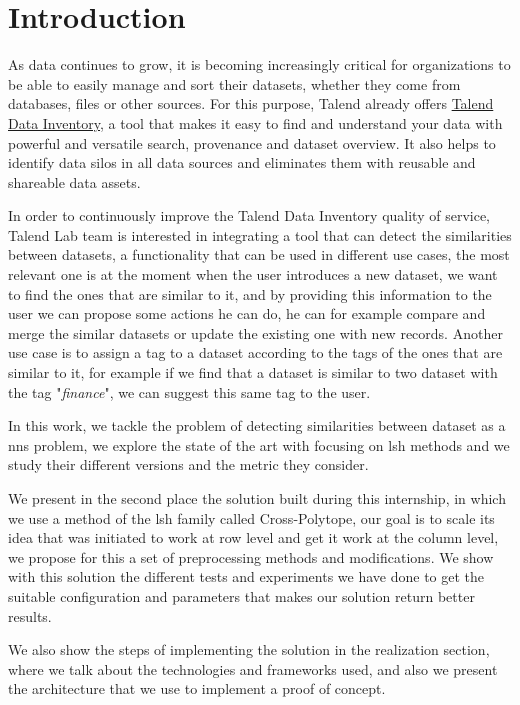 \chapter*{Introduction}

As data continues to grow, it is becoming increasingly critical for
organizations to be able to easily manage and sort their datasets, whether they
come from databases, files or other sources. For this purpose, Talend already
offers \href{https://www.talend.com/products/data-inventory/}{Talend Data
Inventory}, a tool that makes it easy to find and understand your data with
powerful and versatile search, provenance and dataset overview. It also helps to
identify data silos in all data sources and eliminates them with reusable and
shareable data assets.

In order to continuously improve the Talend Data Inventory quality of service,
Talend Lab team is interested in integrating a tool that can detect the
similarities between datasets, a functionality that can be used in different use
cases, the most relevant one is at the moment when the user introduces a new
dataset, we want to find the ones that are similar to it, and by providing this
information to the user we can propose some actions he can do, he can for
example compare and merge the similar datasets or update the existing one with
new records. Another use case is to assign a tag to a dataset according to the
tags of the ones that are similar to it, for example if we find that a dataset
is similar to two dataset with the tag "\textit{finance}", we can suggest this
same tag to the user.

In this work, we tackle the problem of detecting similarities between dataset as
a \Acrfull{nns} problem, we explore the state of the art with focusing on
\Acrfull{lsh} methods and we study their different versions and the metric they
consider.

We present in the second place the solution built during this internship, in
which we use a method of the \acrshort{lsh} family called Cross-Polytope, our
goal is to scale its idea that was initiated to work at row level and get it
work at the column level, we propose for this a set of preprocessing methods and
modifications. We show with this solution the different tests and experiments we
have done to get the suitable configuration and parameters that makes our
solution return better results.

We also show the steps of implementing the solution in the realization section,
where we talk about the technologies and frameworks used, and also we present
the architecture that we use to implement a proof of concept.

